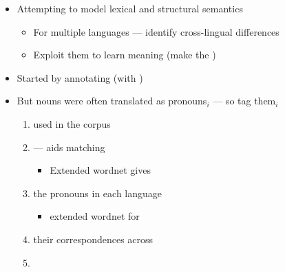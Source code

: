 \documentclass[a4paper,landscape,headrule,footrule,dvips]{foils}
\begin{document}
\begin{CJK}{UTF8}{min}

    \begin{itemize}
    \item Attempting to model lexical and structural semantics
    \begin{itemize}
    \item For multiple languages --- identify cross-lingual differences
    \item Exploit them to learn meaning (make the  )
    \end{itemize}
  \item Started by annotating  (with )
    \item But  nouns were often translated as pronouns$_i$ 
      --- so tag them$_i$
      \begin{enumerate}
      \item {} used in the corpus
      \item {} --- aids matching 
        \begin{itemize}
        \item Extended wordnet gives 
        \end{itemize}
      \item {} the pronouns  in each language
        \begin{itemize}
        \item {} extended wordnet for 
        \end{itemize}
      \item {} their correspondences across 
      \item {}
      \end{enumerate}
    \end{itemize}







\end{CJK}
\end{document}
